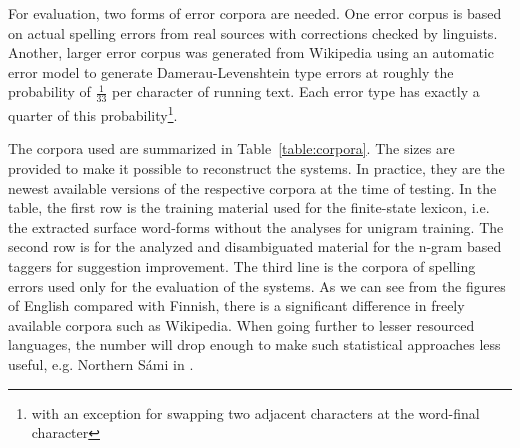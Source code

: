 \documentclass{llncs}
\begin{document}
For evaluation, two forms of error corpora are needed. One error corpus is based
on actual spelling errors from real sources with corrections
checked by linguists. Another, larger error corpus was generated from Wikipedia
using an automatic error model to generate Damerau-Levenshtein type errors at
roughly the probability of $\frac{1}{33}$ per character of running text. Each
error type has exactly a quarter of this probability\footnote{with an exception for
swapping two adjacent characters at the word-final character}. 

The corpora used are summarized in Table~\ref{table:corpora}. The sizes are
provided to make it possible to reconstruct the systems. In practice, they are the newest
available versions of the respective corpora at the time of testing. In the
table, the first row is the training material used for the finite-state
lexicon, i.e. the extracted surface word-forms without the analyses for unigram
training. The second row is for the analyzed and disambiguated material for the
n-gram based taggers for suggestion improvement. The third line is the corpora
of spelling errors used only for the evaluation of the systems.  As we can see
from the figures of English compared with Finnish, there is a significant
difference in freely available corpora such as Wikipedia. When going further to
lesser resourced languages, the number will drop enough to make such statistical
approaches less useful, e.g. Northern S\'{a}mi in \cite{pirinen/2010/lrec}.
\end{document}
